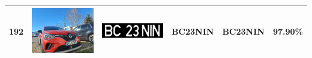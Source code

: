 \documentclass[a4paper,12pt]{report}
\begin{document}
\begin{longtable}{| m{0.6cm} | m{3cm} | m{3cm} | m{1.8cm} | m{1.8cm} | m{1.8cm} |}
    192 & \includegraphics[width=3cm,keepaspectratio]{dataset/118_s2.jpg} & \includegraphics[width=3cm,keepaspectratio]{segmentari/192.jpg} & BC23NIN             & BC23NIN              & 97.90\%    \\ \hline
\end{longtable}
\end{document}
